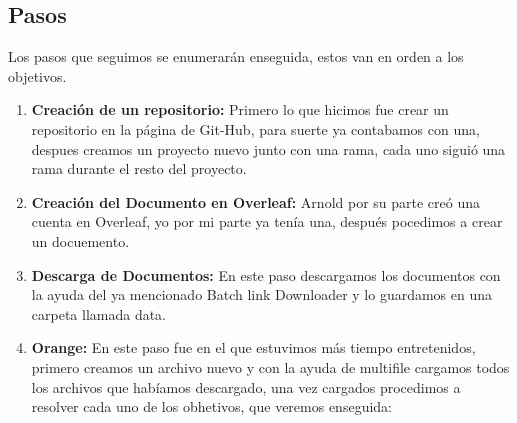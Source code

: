 \subsection*{Pasos}
Los pasos que seguimos se enumerarán enseguida, estos van en orden a los objetivos.
\begin{enumerate}[1.]
    \item{\bfseries Creación de un repositorio:} Primero lo que hicimos fue crear un repositorio en la página de Git-Hub, para suerte ya contabamos con una, despues creamos un proyecto nuevo junto con una rama, cada uno siguió una rama durante el resto del proyecto.
    \item{\bfseries Creación del Documento en Overleaf:} Arnold por su parte creó una cuenta en Overleaf, yo por mi parte ya tenía una, después pocedimos a crear un docuemento.
    \item{\bfseries Descarga de Documentos:} En este paso descargamos los documentos con la ayuda del ya mencionado Batch link Downloader y lo guardamos en una carpeta llamada data.
    \item{\bfseries Orange:} En este paso fue en el que estuvimos más tiempo entretenidos, primero creamos un archivo nuevo y con la ayuda de multifile cargamos todos los archivos que habíamos descargado, una vez cargados procedimos a resolver cada uno de los obhetivos, que veremos enseguida:


\end{enumerate}
